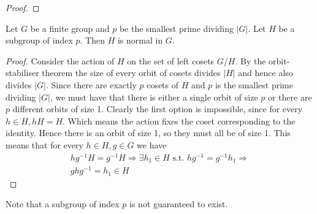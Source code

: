 \begin{proof}
\end{proof}

\begin{theorem}
  Let $G$ be a finite group and $p$ be the smallest prime dividing $|G|$. Let $H$ be a
  subgroup of index $p$. Then $H$ is normal in $G$.
  \label{thm:cauchyGeneral}
\end{theorem}
\begin{proof}
    Consider the action of $H$ on the set of left cosets $G/H$. By the orbit-stabiliser theorem the size of every orbit of cosets divides $|H|$ and hence also divides $|G|$. Since there are exactly $p$ cosets of $H$ and $p$ is the smallest prime dividing $|G|$, we must have that there is either a single orbit of size $p$ or there are $p$ different orbits of size 1.
    Clearly the first option is impossible, since for every $h \in H, hH = H$. Which means the action fixes the coset corresponding to the identity. Hence there is an orbit of size 1, so they must all be of size 1.
    This means that for every $h \in H, g \in G$ we have
    $$
        \begin{gathered}
        h g^{-1} H=g^{-1} H \Longrightarrow \exists h_1 \in H \text { s.t. } h g^{-1}=g^{-1} h_1 \Longrightarrow \\
        g h g^{-1}=h_1 \in H
        \end{gathered}
    $$
\end{proof}
\begin{remark}
    Note that a subgroup of index $p$ is not guaranteed to exist.
\end{remark}
